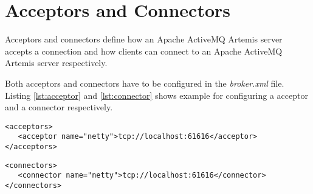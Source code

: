\section{Acceptors and Connectors}

Acceptors and connectors define how an Apache ActiveMQ Artemis server accepts a connection and how clients can connect to an Apache ActiveMQ Artemis server respectively.

Both acceptors and connectors have to be configured in the \textit{broker.xml} file. Listing \ref{lst:acceptor} and \ref{lst:connector} shows example for configuring a acceptor and a connector respectively.

\bigskip
\begin{lstlisting}[style=XmlInputStyle,caption=Configuring Acceptor Example, label={lst:acceptor}]
<acceptors>
   <acceptor name="netty">tcp://localhost:61616</acceptor>
</acceptors>
\end{lstlisting}

\bigskip
\begin{lstlisting}[style=XmlInputStyle,caption=Configuring Connector Example, label={lst:connector}]
<connectors>
   <connector name="netty">tcp://localhost:61616</connector>
</connectors>
\end{lstlisting}
